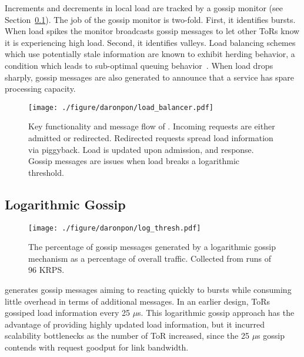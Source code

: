 Increments and decrements in local load are tracked by a gossip monitor (see
Section~\ref{darapon:sec:design:gossip}). The job of the gossip monitor is two-fold. First,
it identifies bursts. When load spikes the monitor broadcasts gossip messages
to let other ToRs know it is experiencing high load. Second, it identifies
valleys. Load balancing schemes which use potentially stale information are
known to exhibit herding behavior, a condition which leads to sub-optimal
queuing behavior~\cite{dahlin_stale_info,mitzenmacher_old_info}. When load
drops sharply, gossip messages are also generated to announce that a service
has spare processing capacity.

\begin{figure}[t]
  \centering
    \texttt{[image: ./figure/daronpon/load\_balancer.pdf]}
    \centering

    \caption[Key functionality and message flow of \daronpon.]{
        Key functionality and message flow of \daronpon.
        Incoming requests are either admitted or redirected.
        Redirected requests spread load information via piggyback.
        Load is updated upon admission, and response.  Gossip messages
        are issues when load breaks a logarithmic threshold.}

  \label{fig:load_balancer}
\end{figure}

\subsection{Logarithmic Gossip}
\label{darapon:sec:design:gossip}

\begin{figure}[t]
  \centering
    \texttt{[image: ./figure/daronpon/log\_thresh.pdf]}
    \centering
    \caption{The percentage of gossip messages generated by a
    logarithmic gossip mechanism as a percentage of overall traffic.
    Collected from runs of 96 KRPS.} 
  \label{fig:log_thresh}
\end{figure}

\daronpon generates gossip messages aiming to reacting quickly to bursts while consuming little overhead in terms of additional messages.  
%
In an earlier design, ToRs gossiped load information every 25 $\mu$s. 
%
This logarithmic gossip approach has the advantage of providing highly updated load information, but it incurred scalability bottlenecks as the number of ToR increased, since the 25 $\mu$s gossip contends with request goodput for link bandwidth.


